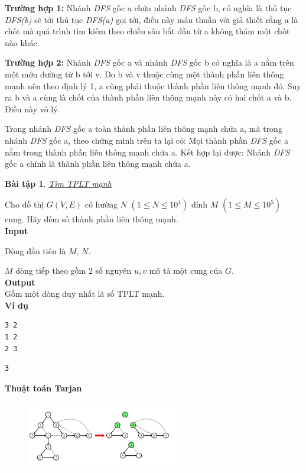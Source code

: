 \documentclass{article}
\newtheorem{baitap}{Bài tập}
\begin{document}
\textbf{Trường hợp 1:} Nhánh \textit{DFS} gốc a chứa nhánh \textit{DFS} gốc b, có nghĩa là thủ tục \textit{DFS(b)} sẽ tới thủ tục \textit{DFS(a)} gọi tới, điều này mâu thuẫn với giả thiết rằng a là chốt mà quá trình tìm kiếm theo chiều sâu bắt đầu từ a không thăm một chốt nào khác.

\textbf{Trường hợp 2:} Nhánh \textit{DFS} gốc a và nhánh \textit{DFS} gốc b có nghĩa là a nằm trên một mớn đường từ b tới v. Do b và v thuộc cùng một thành phần liên thông mạnh nên theo định lý 1, a cũng phải thuộc thành phần liên thông mạnh đó. Suy ra b và a cùng là chốt của thành phần liên thông mạnh này có hai chốt a và b. Điều này vô lý.

Trong nhánh \textit{DFS} gốc a toàn thành phần liên thông mạnh chứa a, mà trong nhánh \textit{DFS} gốc a, theo chứng minh trên ta lại có: Mọi thành phần \textit{DFS} gốc a nằm trong thành phần liên thông mạnh chứa a. Kết hợp lại được: Nhánh \textit{DFS} gốc a chính là thành phần liên thông mạnh chứa a.

\begin{baitap}
    \href{https://oj.vnoi.info/problem/tjalg}{Tìm TPLT mạnh}
\end{baitap}

Cho đồ thị $G(V, E)$ có hướng $N$ $(1\leq N \leq 10^4)$ đỉnh $M$ $(1 \leq M \leq 10^5)$ cung. Hãy đếm số thành phần liên thông mạnh.\\

\textbf{Input}

Dòng đầu tiên là $M$, $N$.

$M$ dòng tiếp theo gồm 2 số nguyên $u, v$ mô tả một cung của $G$.\\

\textbf{Output} \\

Gồm một dòng duy nhất là số TPLT mạnh.\\

\textbf{Ví dụ}

\begin{lstlisting}[caption={Input}]
3 2
1 2
2 3
\end{lstlisting}

\begin{lstlisting}[caption={Output}]
3
\end{lstlisting}

\textbf{Thuật toán Tarjan}

\begin{figure}[h]
    \centering
    \includegraphics[width=0.6\textwidth]{img/b5/Depth-First-Search-Tree_img15.png}
\end{figure}
\end{document}
